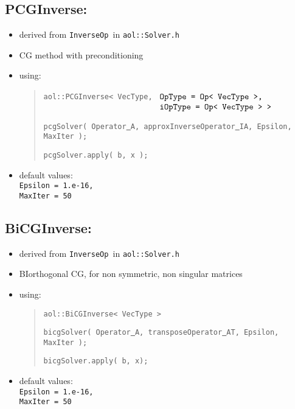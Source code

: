 
\subsection{ PCGInverse: }
\begin{itemize}
\item derived from \texttt{InverseOp }in \texttt{aol::Solver.h}
\item CG method with preconditioning
\item using: \begin{quote}
\texttt{aol::PCGInverse< VecType,}
$\begin{array}[t]{l}
\texttt{OpType = Op< VecType >,} \\ \texttt{iOpType = Op< VecType > > }
\end{array}$
\begin{flushright} \texttt{pcgSolver( Operator\underline{ }A, approxInverseOperator\underline{ }IA, Epsilon, MaxIter ); }
\end{flushright}
\texttt{pcgSolver.apply( b, x );} \end{quote}
\item default values: \\
\texttt{Epsilon = 1.e-16, \\ MaxIter = 50}
\end{itemize}


\subsection{ BiCGInverse:}
\begin{itemize}
\item derived from \texttt{InverseOp }in \texttt{aol::Solver.h}
\item BIorthogonal CG, for non symmetric, non singular matrices
\item using: \begin{quote}
\texttt{aol::BiCGInverse< VecType > }
\begin{flushright} \texttt{bicgSolver( Operator\underline{ }A, transposeOperator\underline{ }AT, Epsilon, MaxIter );} \end{flushright}
\texttt{bicgSolver.apply( b, x); } \end{quote}
\item default values: \\
\texttt{Epsilon = 1.e-16, \\ MaxIter = 50}
\end{itemize}

